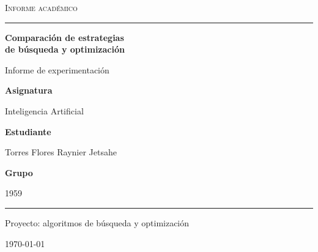 \documentclass[12pt,letterpaper]{article}
\begin{document}
\begin{titlepage}
  \pagecolor{navy}
  \color{white}
  \centering
  \vspace*{1.0cm}
  {\Large\scshape Informe académico\par}
  \vspace{0.7cm}
  {\color{blue}\rule{0.78\textwidth}{1.2pt}\par}
  \vspace{1.4cm}
  {\Huge\bfseries Comparación de estrategias\\[0.25em]
  de búsqueda y optimización\par}
  \vspace{0.8cm}
  {\Large Informe de experimentación\par}
  \vspace{1.6cm}
  {\large\textbf{Asignatura}\par}
  \vspace{0.2cm}
  {\Large Inteligencia Artificial\par}
  \vspace{1.0cm}
  {\large\textbf{Estudiante}\par}
  \vspace{0.2cm}
  {\Large Torres Flores Raynier Jetsahe\par}
  \vspace{0.8cm}
  {\large\textbf{Grupo}\par}
  \vspace{0.2cm}
  {\Large 1959\par}
  \vfill
  {\color{blue}\rule{0.78\textwidth}{1.2pt}\par}
  \vspace{0.5cm}
  {\large Proyecto: algoritmos de búsqueda y optimización\par}
  \vspace{0.4cm}
  {\large \today\par}
\end{titlepage}
\nopagecolor
\color{ink}
\setcounter{page}{1}

\begin{abstract}
Este informe presenta una comparación experimental de búsqueda sistemática y
metaheurísticas en N-Reinas, mochila 0/1, coloreado de grafos y la función
continua Eggholder. Se explican las estrategias, las representaciones de
solución y la configuración empleada. Los resultados se interpretan separando
dos conceptos: la \emph{factibilidad}, que indica si se respetan las
restricciones, y la \emph{calidad}, que indica qué tan conveniente es una
solución factible. La ejecución documentada usa un presupuesto rápido y una
repetición por instancia; por ello sus resultados son evidencia exploratoria,
no una conclusión estadística ni una garantía de optimalidad.
\end{abstract}
\end{document}
